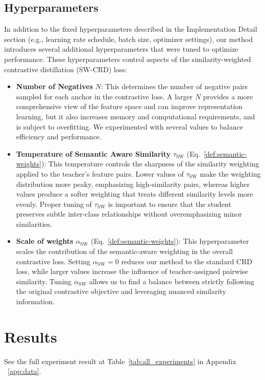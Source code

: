 \documentclass{article}
\theoremstyle{plain}
\theoremstyle{remark}
\begin{document}
\subsection{Hyperparameters}
In addition to the fixed hyperparameters described in the Implementation Detail section (e.g., learning rate schedule, batch size, optimizer settings), our method introduces several additional hyperparameters that were tuned to optimize performance. These hyperparameters control aspects of the similarity-weighted contrastive distillation (SW-CRD) loss:
\begin{itemize}
    \item \textbf{Number of Negatives} $N$: This determines the number of negative pairs sampled for each anchor in the contrastive loss. A larger $N$ provides a more comprehensive view of the feature space and can improve representation learning, but it also increases memory and computational requirements, and is subject to overfitting. We experimented with several values to balance efficiency and performance.
    \item \textbf{Temperature of Semantic Aware Similarity} $\tau_{\text{SW}}$ (Eq.~\ref{def:semantic-weights}): This temperature controls the sharpness of the similarity weighting applied to the teacher’s feature pairs. Lower values of $\tau_{\text{SW}}$ make the weighting distribution more peaky, emphasizing high-similarity pairs, whereas higher values produce a softer weighting that treats different similarity levels more evenly. Proper tuning of $\tau_{\text{SW}}$ is important to ensure that the student preserves subtle inter-class relationships without overemphasizing minor similarities.  
    \item \textbf{Scale of weights} $\alpha_{\text{SW}}$ (Eq.~\ref{def:semantic-weights}): This hyperparameter scales the contribution of the semantic-aware weighting in the overall contrastive loss. Setting $\alpha_{\text{SW}}=0$ reduces our method to the standard CRD loss, while larger values increase the influence of teacher-assigned pairwise similarity. Tuning $\alpha_{\text{SW}}$ allows us to find a balance between strictly following the original contrastive objective and leveraging nuanced similarity information.  
\end{itemize}

\section{Results}

See the full experiment result at Table~\ref{tab:all_experiments} in Appendix ~\ref{app:data}.
\end{document}
